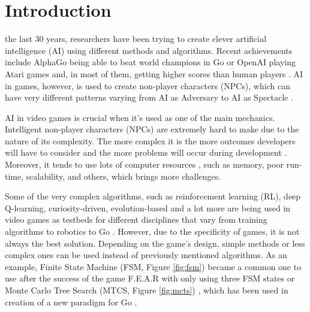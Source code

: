 \documentclass[journal]{IEEEtran}
\begin{document}
\section{Introduction}
% 
% 
% 
% 
 the last 30 years, researchers have been trying to create clever artificial intelligence (AI) using different methods and algorithms. Recent achievements include AlphaGo being able to beat world champions in Go \cite{alphago} or OpenAI playing Atari games and, in most of them, getting higher scores than human players \cite{mnih2015human}. AI in games, however, is used to create non-player characters (NPCs), which can have very different patterns varying from AI as Adversary to AI as Spectacle \cite{treanor2015ai}. 

AI in video games is crucial when it's used as one of the main mechanics. Intelligent non-player characters (NPCs) are extremely hard to make due to the nature of its complexity. The more complex it is the more outcomes developers will have to consider and the more problems will occur during development \cite{gdchalo2}. Moreover, it tends to use lots of computer resources \cite{gdchalo2}, such as memory, poor run-time, scalability, and others, which brings more challenges.

Some of the very complex algorithms, such as reinforcement learning (RL), deep Q-learning, curiosity-driven, evolution-based and a lot more are being used in video games as testbeds for different disciplines that vary from training algorithms \cite{aiinvideogames}\cite{robotplayground} to robotics \cite{schmidhuber2006developmental}\cite{colledanchise2018behavior}\cite{brady1985artificial}\cite{oudeyer2004intelligent} to Go \cite{schaul2011measuring}\cite{alphago}. However, due to the specificity of games, it is not always the best solution. Depending on the game's design, simple methods or less complex ones can be used instead of previously mentioned algorithms. As an example, Finite State Machine (FSM, Figure \ref{fig:fsm}) became a common one to use after the success of the game F.E.A.R with only using three FSM states \cite{orkin2006three} or Monte Carlo Tree Search (MTCS, Figure \ref{fig:mcts}) \cite{chaslot2008monte}, which has been used in creation of a new paradigm for Go \cite{gelly2011monte}\cite{gelly2012grand}. %
\end{document}
